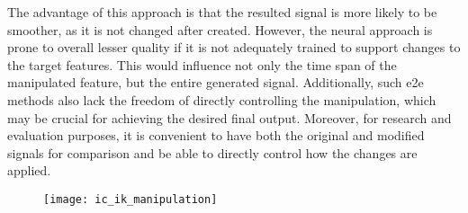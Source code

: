 The advantage of this approach is that the resulted signal is more likely to be smoother, as it is not changed after created.
However, the neural approach is prone to overall lesser quality if it is not adequately trained to support changes to the target features.
This would influence not only the time span of the manipulated feature, but the entire generated signal.
Additionally, such \ac{e2e} methods also lack the freedom of directly controlling the manipulation, which may be crucial for achieving the desired final output.
Moreover, for research and evaluation purposes, it is convenient to have both the original and modified signals for comparison and be able to directly control how the changes are applied.
%
\begin{landscape}
	\begin{figure}[t]
		\centering
		\hspace*{-2cm}
		\texttt{[image: ic\_ik\_manipulation]}
		\caption[]
			{}
		\label{fig:spectrogram_e_E}
	\end{figure}
\end{landscape}
%



